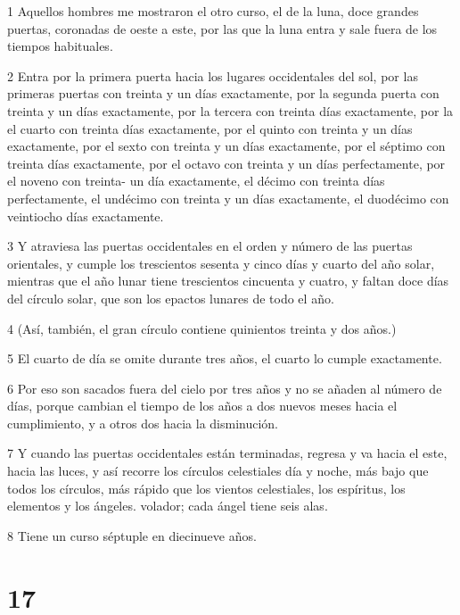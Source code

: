 \par 1 Aquellos hombres me mostraron el otro curso, el de la luna, doce grandes puertas, coronadas de oeste a este, por las que la luna entra y sale fuera de los tiempos habituales.

\par 2 Entra por la primera puerta hacia los lugares occidentales del sol, por las primeras puertas con treinta y un días exactamente, por la segunda puerta con treinta y un días exactamente, por la tercera con treinta días exactamente, por la el cuarto con treinta días exactamente, por el quinto con treinta y un días exactamente, por el sexto con treinta y un días exactamente, por el séptimo con treinta días exactamente, por el octavo con treinta y un días perfectamente, por el noveno con treinta- un día exactamente, el décimo con treinta días perfectamente, el undécimo con treinta y un días exactamente, el duodécimo con veintiocho días exactamente.

\par 3 Y atraviesa las puertas occidentales en el orden y número de las puertas orientales, y cumple los trescientos sesenta y cinco días y cuarto del año solar, mientras que el año lunar tiene trescientos cincuenta y cuatro, y faltan doce días del círculo solar, que son los epactos lunares de todo el año.

\par 4 (Así, también, el gran círculo contiene quinientos treinta y dos años.)

\par 5 El cuarto de día se omite durante tres años, el cuarto lo cumple exactamente.

\par 6 Por eso son sacados fuera del cielo por tres años y no se añaden al número de días, porque cambian el tiempo de los años a dos nuevos meses hacia el cumplimiento, y a otros dos hacia la disminución.

\par 7 Y cuando las puertas occidentales están terminadas, regresa y va hacia el este, hacia las luces, y así recorre los círculos celestiales día y noche, más bajo que todos los círculos, más rápido que los vientos celestiales, los espíritus, los elementos y los ángeles. volador; cada ángel tiene seis alas.

\par 8 Tiene un curso séptuple en diecinueve años.

\chapter{17}

